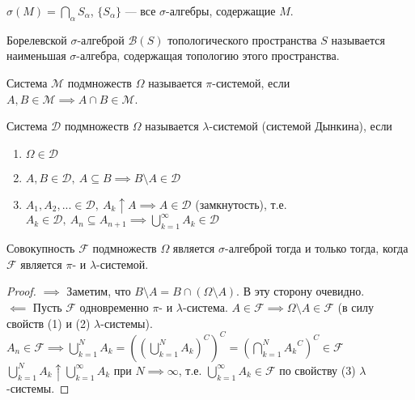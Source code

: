         \begin{prop}\label{lect01:prop3}
            $\sigma(M) = \bigcap\limits_\alpha S_\alpha$, $\{S_\alpha\}$ --- все $\sigma$-алгебры, содержащие $M$. 
        \end{prop}
        \begin{definition}\label{lect01:def4}
            Борелевской $\sigma$-алгеброй $\mathcal{B}(S)$ топологического пространства $S$ называется наименьшая $\sigma$-алгебра, содержащая топологию этого пространства.
        \end{definition}
        \begin{definition}\label{lect01:def5}
            Система $\mathcal{M}$ подмножеств $\Omega$ называется $\pi$-системой, если $A, B \in \mathcal{M} \implies A \cap B \in \mathcal{M}$.
        \end{definition}
        \begin{definition}\label{lect01:def6}
            Система $\mathcal{D}$ подмножеств $\Omega$ называется $\lambda$-системой (системой Дынкина), если
            \begin{enumerate}
                \item $\Omega \in \mathcal{D}$
                \item $A, B \in \mathcal{D}, \ A \subseteq B \implies B \setminus A \in \mathcal{D}$
                \item $A_1, A_2, ... \in \mathcal{D}, \ A_k \uparrow A \implies A \in \mathcal{D}$ (замкнутость), т.е. $A_k \in \mathcal{D}, \ A_n \subseteq A_{n+1} \implies \bigcup\limits_{k=1}^{\infty}A_k \in \mathcal{D}$
            \end{enumerate}
        \end{definition}
        \begin{theorem}\label{lect01:th1}
            Совокупность $\mathcal{F}$ подмножеств $\Omega$ является $\sigma$-алгеброй тогда и только тогда, когда $\mathcal{F}$ является $\pi$- и $\lambda$-системой.
        \end{theorem}
        \begin{proof}
            $\implies$ Заметим, что $B \setminus A = B \cap (\Omega \setminus A)$. В эту сторону очевидно.\\
            $\impliedby$ Пусть $\mathcal{F}$ одновременно $\pi$- и $\lambda$-система. $A \in \mathcal{F} \implies \Omega \setminus A \in \mathcal{F}$ (в силу свойств (1) и (2) $\lambda$-системы).  \\
            $A_n \in \mathcal{F} \implies \bigcup\limits_{k=1}^{N}A_k = {\left({\left(\bigcup\limits_{k=1}^{N}A_k\right)}^C\right)}^C = {\left(\bigcap\limits_{k=1}^{N}{A_k}^C\right)}^C \in \mathcal{F}$\\
            $\bigcup\limits_{k=1}^{N}A_k \uparrow \bigcup\limits_{k=1}^{\infty}A_k$ при $N \implies \infty$, т.е. $\bigcup\limits_{k=1}^{\infty}A_k \in \mathcal{F}$ по свойству (3) $\lambda$-системы.
        \end{proof}

